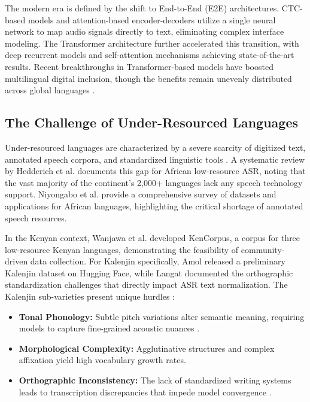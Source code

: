 \documentclass[conference]{IEEEtran}
\begin{document}
The modern era is defined by the shift to End-to-End (E2E) architectures. CTC-based models \cite{b12} and attention-based encoder-decoders \cite{b13} utilize a single neural network to map audio signals directly to text, eliminating complex interface modeling. The Transformer architecture \cite{b23} further accelerated this transition, with deep recurrent models \cite{b24} and self-attention mechanisms achieving state-of-the-art results. Recent breakthroughs in Transformer-based models have boosted multilingual digital inclusion, though the benefits remain unevenly distributed across global languages \cite{b3}.

\subsection{The Challenge of Under-Resourced Languages}

Under-resourced languages are characterized by a severe scarcity of digitized text, annotated speech corpora, and standardized linguistic tools \cite{b5, b26}. A systematic review by Hedderich et al. \cite{b25} documents this gap for African low-resource ASR, noting that the vast majority of the continent's 2,000+ languages lack any speech technology support. Niyongabo et al. \cite{b30} provide a comprehensive survey of datasets and applications for African languages, highlighting the critical shortage of annotated speech resources.

In the Kenyan context, Wanjawa et al. \cite{b31} developed KenCorpus, a corpus for three low-resource Kenyan languages, demonstrating the feasibility of community-driven data collection. For Kalenjin specifically, Amol \cite{b32} released a preliminary Kalenjin dataset on Hugging Face, while Langat \cite{b33} documented the orthographic standardization challenges that directly impact ASR text normalization. The Kalenjin sub-varieties present unique hurdles \cite{b7, b34}:
\begin{itemize}
    \item \textbf{Tonal Phonology:} Subtle pitch variations alter semantic meaning, requiring models to capture fine-grained acoustic nuances \cite{b35}.
    \item \textbf{Morphological Complexity:} Agglutinative structures and complex affixation yield high vocabulary growth rates.
    \item \textbf{Orthographic Inconsistency:} The lack of standardized writing systems leads to transcription discrepancies that impede model convergence \cite{b33}.
\end{itemize}
\end{document}
